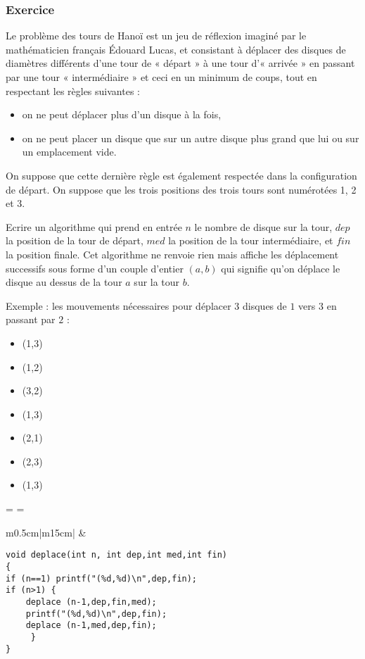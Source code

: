 \documentclass[french,12pt,a4paper,twoside,openright,titlepage]{report}
\newcounter{exo}\stepcounter{exo}
\newcommand\exercice[1]{
\subsubsection*{Exercice \theexo\stepcounter{exo} {#1}}
}
\newlength\Linewidth
\def\findlength{\setlength\Linewidth\linewidth
\addtolength\Linewidth{-4\fboxrule}
\addtolength\Linewidth{-3\fboxsep}
}
\newenvironment{examplebox}{\par\begingroup%
   \setlength{\fboxsep}{5pt}\findlength%
   \setbox0=\vbox\bgroup\noindent%
   \hsize=\Linewidth%
   \begin{minipage}{\Linewidth}\small}%
    {\end{minipage}\egroup%
    \vspace{6pt}%
    \noindent\textcolor{gray20}{\fboxsep2.5pt\fbox%
     {\fboxsep5pt\colorbox{gray05}{\normalcolor\box0}}}%
    \endgroup\par\addvspace{6pt minus 3pt}\noindent%
    \normalcolor\ignorespacesafterend}
\newenvironment{solution}
{
\begin{examplebox}
\begin{center}
\begin{tabular}{m{0.5cm}|m{15cm}|}\cline{2-2}
\rotatebox{90}{Solution}&
\begin{minipage}[H]{\linewidth}
\vspace{0.2cm}
}
{
\vspace{0.2cm}
\end{minipage}
\\\cline{2-2}
\end{tabular}
\end{center}
\end{examplebox}
}
\begin{document}
\exercice{}

Le problème des tours de Hanoï est un jeu de réflexion imaginé par le mathématicien français Édouard Lucas, et consistant à déplacer des disques de diamètres différents d'une tour de « départ » à une tour d'« arrivée » en passant par une tour « intermédiaire » et ceci en un minimum de coups, tout en respectant les règles suivantes :
\begin{itemize}
    \item on ne peut déplacer plus d'un disque à la fois,
    \item  on ne peut placer un disque que sur un autre disque plus grand que lui ou sur un emplacement vide.
\end{itemize}
On suppose que cette dernière règle est également respectée dans la configuration de départ.
On suppose que les trois positions des trois tours sont numérotées 1, 2 et 3.

Ecrire un algorithme qui prend en entrée $n$ le nombre de disque sur
la tour, $dep$ la position de la tour de départ, $med$ la position de
la tour intermédiaire, et $fin$ la position finale. Cet algorithme ne renvoie rien mais  affiche les déplacement successifs sous forme d'un couple d'entier $(a,b)$ qui signifie qu'on déplace le disque au dessus de la tour $a$ sur la tour $b$.

Exemple : les mouvements nécessaires pour déplacer 3 disques de $1$ vers $3$ en passant par $2$ :
\begin{itemize}
\item (1,3)
\item (1,2)
\item (3,2)
\item (1,3)
\item (2,1)
\item (2,3)
\item (1,3)
\end{itemize}

\begin{solution}
\begin{verbatim}
void deplace(int n, int dep,int med,int fin)
{
if (n==1) printf("(%d,%d)\n",dep,fin);
if (n>1) {
	deplace (n-1,dep,fin,med);
	printf("(%d,%d)\n",dep,fin);
	deplace (n-1,med,dep,fin);
	 }
}

\end{verbatim}

\end{solution}



\end{document}
